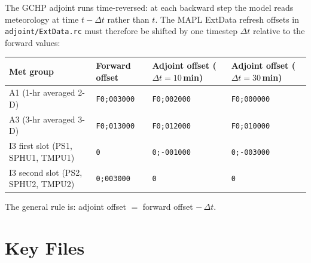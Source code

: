 \documentclass[12pt]{article}
\begin{document}
The GCHP adjoint runs time-reversed: at each backward step the model reads
meteorology at time $t - \Delta t$ rather than $t$.  The MAPL ExtData refresh
offsets in \texttt{adjoint/ExtData.rc} must therefore be shifted by one
timestep $\Delta t$ relative to the forward values:

\begin{table}[h!]
\centering
\begin{tabular}{llll}
\toprule
Met group & Forward offset & Adjoint offset ($\Delta t = 10$\,min)
          & Adjoint offset ($\Delta t = 30$\,min) \\
\midrule
A1 (1-hr averaged 2-D) & \texttt{F0;003000} & \texttt{F0;002000} & \texttt{F0;000000} \\
A3 (3-hr averaged 3-D) & \texttt{F0;013000} & \texttt{F0;012000} & \texttt{F0;010000} \\
I3 first slot (PS1, SPHU1, TMPU1) & \texttt{0} & \texttt{0;-001000} & \texttt{0;-003000} \\
I3 second slot (PS2, SPHU2, TMPU2) & \texttt{0;003000} & \texttt{0} & \texttt{0} \\
\bottomrule
\end{tabular}
\end{table}

The general rule is: adjoint offset $=$ forward offset $-\,\Delta t$.

\section{Key Files}
\end{document}
